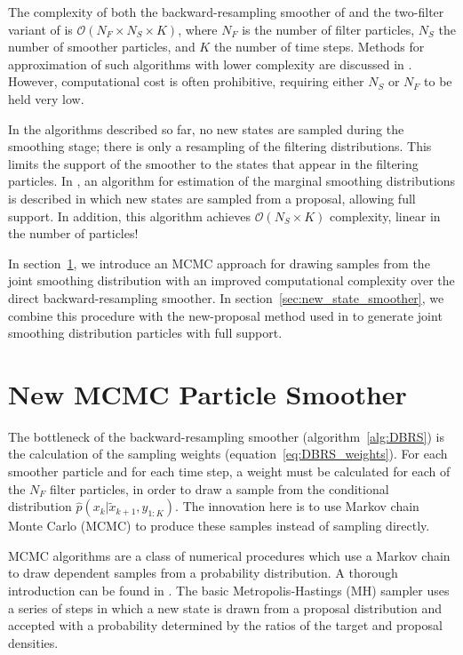\documentclass[journal]{IEEEtran}
\begin{document}
The complexity of both the backward-resampling smoother of \cite{Godsill2004} and the two-filter variant of \cite{Briers2010} is $\mathcal{O}(N_F \times N_S \times K)$, where $N_F$ is the number of filter particles, $N_S$ the number of smoother particles, and $K$ the number of time steps. Methods for approximation of such algorithms with lower complexity are discussed in \cite{Klaas2006}. However, computational cost is often prohibitive, requiring either $N_S$ or $N_F$ to be held very low. 

In the algorithms described so far, no new states are sampled during the smoothing stage; there is only a resampling of the filtering distributions. This limits the support of the smoother to the states that appear in the filtering particles. In \cite{Fearnhead2010}, an algorithm for estimation of the marginal smoothing distributions is described in which new states are sampled from a proposal, allowing full support. In addition, this algorithm achieves $\mathcal{O}( N_S \times K)$ complexity, linear in the number of particles!

In section~\ref{sec:mcmc_smoother}, we introduce an MCMC approach for drawing samples from the joint smoothing distribution with an improved computational complexity over the direct backward-resampling smoother. In section~\ref{sec:new_state_smoother}, we combine this procedure with the new-proposal method used in \cite{Fearnhead2010} to generate joint smoothing distribution particles with full support.



\section{New MCMC Particle Smoother} \label{sec:mcmc_smoother}

The bottleneck of the backward-resampling smoother (algorithm~\ref{alg:DBRS}) is the calculation of the sampling weights (equation~\ref{eq:DBRS_weights}). For each smoother particle and for each time step, a weight must be calculated for each of the $N_F$ filter particles, in order to draw a sample from the conditional distribution $\hat{p}(x_k|\tilde{x}_{k+1}, y_{1:K})$. The innovation here is to use Markov chain Monte Carlo (MCMC) to produce these samples instead of sampling directly.

MCMC algorithms are a class of numerical procedures which use a Markov chain to draw dependent samples from a probability distribution. A thorough introduction can be found in \cite{Gilks1996}. The basic Metropolis-Hastings (MH) \cite{Metropolis1953} sampler uses a series of steps in which a new state is drawn from a proposal distribution and accepted with a probability determined by the ratios of the target and proposal densities.
\end{document}
